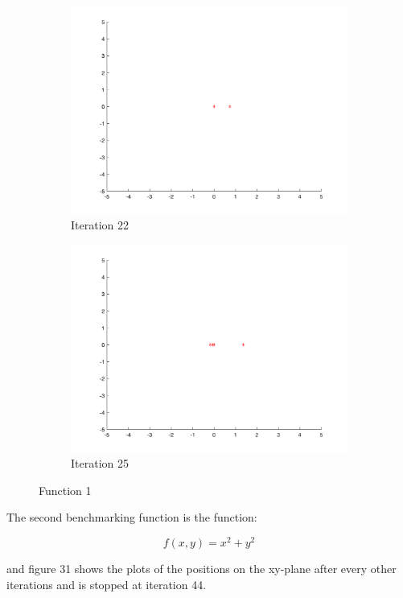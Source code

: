 \begin{figure}
\begin{subfigure}[b]{0.4\textwidth}
    \includegraphics[width=\textwidth]{img/smpl/circ/loa-iter-22}
    \caption{Iteration 22}
    \label{fig:s1-iter-6}
  \end{subfigure}
  \begin{subfigure}[b]{0.4\textwidth}
    \includegraphics[width=\textwidth]{img/smpl/circ/loa-iter-25}
    \caption{Iteration 25}
    \label{fig:s1-iter-7}
  \end{subfigure}
  \caption{Function 1}
\end{figure}

The second benchmarking function is the function:

$$
  f(x, y) = x^2 + y^2
$$

and figure 31 shows the plots of the positions on the xy-plane after every other iterations and is stopped at iteration 44.

